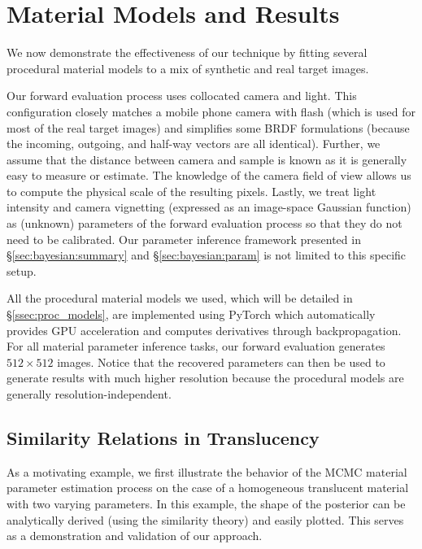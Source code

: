 \section{Material Models and Results}
\label{sec:bayesian:results}

We now demonstrate the effectiveness of our technique by fitting several procedural material models to a mix of synthetic and real target images.

Our forward evaluation process uses collocated camera and light.
This configuration closely matches a mobile phone camera with flash (which is used for most of the real target images) and simplifies some BRDF formulations (because the incoming, outgoing, and half-way vectors are all identical).
Further, we assume that the distance between camera and sample is known as it is generally easy to measure or estimate.
The knowledge of the camera field of view allows us to compute the physical scale of the resulting pixels.
Lastly, we treat light intensity and camera vignetting (expressed as an image-space Gaussian function) as (unknown) parameters of the forward evaluation process so that they do not need to be calibrated.
Our parameter inference framework presented in \S\ref{sec:bayesian:summary} and \S\ref{sec:bayesian:param} is not limited to this specific setup.

All the procedural material models we used, which will be detailed in \S\ref{ssec:proc_models}, are implemented using \textsf{PyTorch} which automatically provides GPU acceleration and computes derivatives through backpropagation. 
For all material parameter inference tasks, our forward evaluation generates $512 \times 512$ images.
Notice that the recovered parameters can then be used to generate results with much higher resolution because the procedural models are generally resolution-independent.

\subsection{Similarity Relations in Translucency}

As a motivating example, we first illustrate the behavior of the MCMC material parameter estimation process on the case of a homogeneous translucent material with two varying parameters.
In this example, the shape of the posterior can be analytically derived (using the similarity theory) and easily plotted. This serves as a demonstration and validation of our approach.



